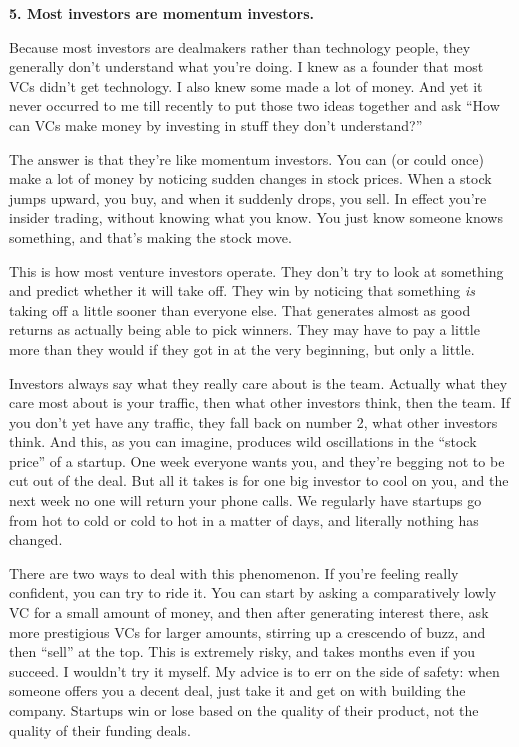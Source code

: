 \documentclass[12pt]{book}
\begin{document}
\textbf{5. Most investors are momentum investors.}

Because most investors are dealmakers rather than technology people,
they generally don't understand what you're doing. I knew as a founder
that most VCs didn't get technology. I also knew some made a lot of
money. And yet it never occurred to me till recently to put those two
ideas together and ask ``How can VCs make money by investing in stuff
they don't understand?''

The answer is that they're like momentum investors. You can (or could
once) make a lot of money by noticing sudden changes in stock prices.
When a stock jumps upward, you buy, and when it suddenly drops, you
sell. In effect you're insider trading, without knowing what you know.
You just know someone knows something, and that's making the stock move.

This is how most venture investors operate. They don't try to look at
something and predict whether it will take off. They win by noticing
that something \emph{is} taking off a little sooner than everyone else.
That generates almost as good returns as actually being able to pick
winners. They may have to pay a little more than they would if they got
in at the very beginning, but only a little.

Investors always say what they really care about is the team. Actually
what they care most about is your traffic, then what other investors
think, then the team. If you don't yet have any traffic, they fall back
on number 2, what other investors think. And this, as you can imagine,
produces wild oscillations in the ``stock price'' of a startup. One week
everyone wants you, and they're begging not to be cut out of the deal.
But all it takes is for one big investor to cool on you, and the next
week no one will return your phone calls. We regularly have startups go
from hot to cold or cold to hot in a matter of days, and literally
nothing has changed.

There are two ways to deal with this phenomenon. If you're feeling
really confident, you can try to ride it. You can start by asking a
comparatively lowly VC for a small amount of money, and then after
generating interest there, ask more prestigious VCs for larger amounts,
stirring up a crescendo of buzz, and then ``sell'' at the top. This is
extremely risky, and takes months even if you succeed. I wouldn't try it
myself. My advice is to err on the side of safety: when someone offers
you a decent deal, just take it and get on with building the company.
Startups win or lose based on the quality of their product, not the
quality of their funding deals.
\end{document}

